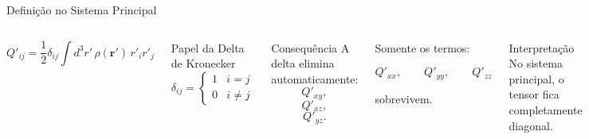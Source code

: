 \documentclass[aspectratio=169]{beamer}
\begin{document}
\begin{frame}{Definição no Sistema Principal}

\begin{columns}[T]


\begin{eqbox}
\begin{equation}
Q'_{ij}
=
\frac12
\delta_{ij}
\int d^3r'\,
\rho(\mathbf r')\,
r'_i r'_j
\tag{4.58}
\end{equation}
\end{eqbox}

\vspace{0.2cm}

\begin{mybox}{Papel da Delta de Kronecker}
\[
\delta_{ij}
=
\begin{cases}
1 & i=j
\\
0 & i\neq j
\end{cases}
\]
\end{mybox}


\begin{alertblock}{Consequência}
A delta elimina automaticamente:
\[
Q'_{xy},
\]
\[
Q'_{xz},
\]
\[
Q'_{yz}.
\]
\end{alertblock}


\begin{center}


Somente os termos:

\[
Q'_{xx},
\qquad
Q'_{yy},
\qquad
Q'_{zz}
\]


sobrevivem.

\end{center}

\vspace{0.3cm}

\begin{mybox}{Interpretação}
No sistema principal,
o tensor fica completamente diagonal.
\end{mybox}

\end{columns}

\end{frame}


\end{document}
